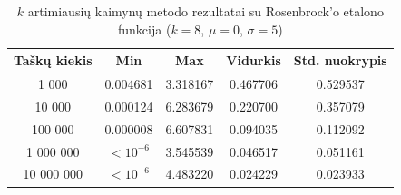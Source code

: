 \begin{table}[H]
    \centering
    \begin{tabular}{|c|c|c|c|c|}
        \hline
        \textbf{Taškų kiekis} & \textbf{Min} & \textbf{Max} & \textbf{Vidurkis} & \textbf{Std. nuokrypis} \\ \hline
        1 000        & 0.004681 & 3.318167 & 0.467706 & 0.529537 \\ \hline
        10 000       & 0.000124 & 6.283679 & 0.220700 & 0.357079 \\ \hline
        100 000      & 0.000008 & 6.607831 & 0.094035 & 0.112092 \\ \hline
        1 000 000    & $<10^{-6}$ & 3.545539 & 0.046517 & 0.051161 \\ \hline
        10 000 000   & $<10^{-6}$ & 4.483220 & 0.024229 & 0.023933 \\ \hline
    \end{tabular}
    \caption{$k$ artimiausių kaimynų metodo rezultatai su Rosenbrock'o etalono funkcija ($k = 8$, $\mu = 0$, $\sigma = 5$)}
\end{table}